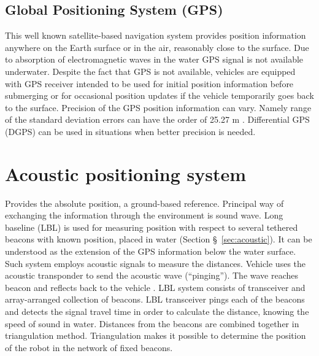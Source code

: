 \subsection{Global Positioning System (GPS)}
This well known satellite-based navigation system provides position information anywhere on the Earth surface or in the air, reasonably close to the surface. Due to absorption of electromagnetic waves in the water GPS signal is not available underwater. Despite the fact that GPS is not available, vehicles are equipped with GPS receiver intended to be used for initial position information before submerging or for occasional position updates if the vehicle temporarily goes back to the surface. Precision of the GPS position information can vary. Namely range of the standard deviation errors can have the order of 25.27 m \cite{farrell98}. Differential GPS (DGPS) \cite{farrell98} can be used in situations when better precision is needed.
\section{Acoustic positioning system}
Provides the absolute position, a ground-based reference. Principal way of exchanging the information through the environment is sound wave. Long baseline (LBL) is used for measuring position with respect to several tethered beacons with known position, placed in water (Section \S~\ref{sec:acoustic}). It can be understood as the extension of the GPS information below the water surface. Such system employs acoustic signals to measure the distances. Vehicle uses the acoustic transponder to send the acoustic wave (``pinging''). The wave reaches beacon and reflects back to the vehicle . LBL system consists of transceiver and array-arranged collection of beacons. LBL transceiver pings each of the beacons and detects the signal travel time in order to calculate the distance, knowing the speed of sound in water. Distances from the beacons are combined together in triangulation method. Triangulation makes it possible to determine the position of the robot in the network of fixed beacons. 

